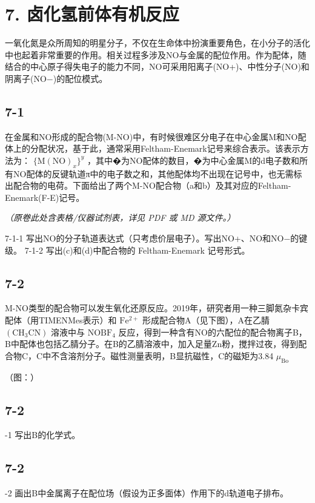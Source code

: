 \section*{7. 卤化氢前体有机反应}
⼀氧化氮是众所周知的明星分⼦，不仅在⽣命体中扮演重要⻆⾊，在⼩分⼦的活化中也起着⾮常重要的作⽤。相关过程多涉及NO与⾦属的配位作⽤。作为配体，随结合的中⼼原⼦得失电⼦的能⼒不同，NO可采⽤阳离⼦(NO+)、中性分⼦(NO)和阴离⼦(NO−)的配位模式。

\subsection*{7-1}
在⾦属和NO形成的配合物(M-NO)中，有时候很难区分电⼦在中⼼⾦属M和NO配体上的分配状况，基于此，通常采⽤Feltham-Enemark记号来综合表⽰。该表⽰⽅法为： $\{ \mathrm { M } ( \mathrm { N O } ) _ { x } \} ^ { y }$ ，其中�为NO配体的数⽬，�为中⼼⾦属M的d电⼦数和所有NO配体的反键轨道π\*中的电⼦数之和，其他配体均不出现在记号中，也⽆需标出配合物的电荷。下⾯给出了两个M-NO配合物（a和b）及其对应的Feltham-Enemark(F-E)记号。

\textit{（原卷此处含表格/仪器试剂表，详见 PDF 或 MD 源文件。）}

7-1-1 写出NO的分⼦轨道表达式（只考虑价层电⼦）。写出NO+、NO和NO−的键级。
7-1-2 写出(c)和(d)中配合物的 Feltham-Enemark 记号形式。

\subsection*{7-2}
M-NO类型的配合物可以发⽣氧化还原反应。2019年，研究者⽤⼀种三脚氮杂卡宾配体（⽤TIMENMes表⽰）和 $\mathrm { F e ^ { 2 + } }$ 形成配合物A（⻅下图），A在⼄腈 $\mathrm { ( C H _ { 3 } C N ) }$ 溶液中与 $\mathrm { N O B F _ { 4 } }$ 反应，得到⼀种含有NO的六配位的配合物离⼦B，B中配体也包括⼄腈分⼦。在B的⼄腈溶液中，加⼊⾜量Zn粉，搅拌过夜，得到配合物C，C中不含溶剂分⼦。磁性测量表明，B显抗磁性，C的磁矩为3.84 $\mu _ { \mathrm { B o } }$

（图：）

\subsection*{7-2}
-1 写出B的化学式。

\subsection*{7-2}
-2 画出B中⾦属离⼦在配位场（假设为正多⾯体）作⽤下的d轨道电⼦排布。

